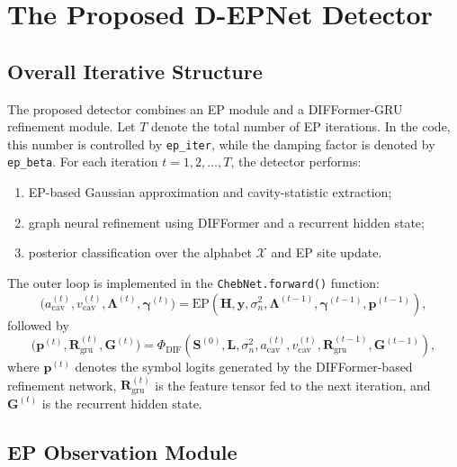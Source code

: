 \documentclass[conference]{IEEEtran}
\begin{document}
\section{The Proposed D-EPNet Detector}

\subsection{Overall Iterative Structure}

The proposed detector combines an EP module and a DIFFormer-GRU refinement module. Let $T$ denote the total number of EP iterations. In the code, this number is controlled by \texttt{ep\_iter}, while the damping factor is denoted by \texttt{ep\_beta}. For each iteration $t=1,2,\ldots,T$, the detector performs:
\begin{enumerate}
\item EP-based Gaussian approximation and cavity-statistic extraction;
\item graph neural refinement using DIFFormer and a recurrent hidden state;
\item posterior classification over the alphabet $\mathcal{X}$ and EP site update.
\end{enumerate}

The outer loop is implemented in the \texttt{ChebNet.forward()} function:
\begin{equation}
\big(a_{\mathrm{cav}}^{(t)}, v_{\mathrm{cav}}^{(t)}, \bm{\Lambda}^{(t)}, \bm{\gamma}^{(t)}\big)
=
\mathrm{EP}\!\left(
\mathbf{H}, \mathbf{y}, \sigma_n^2,
\bm{\Lambda}^{(t-1)}, \bm{\gamma}^{(t-1)},
\mathbf{p}^{(t-1)}
\right),
\end{equation}
followed by
\begin{equation}
\big(\mathbf{p}^{(t)}, \mathbf{R}_{\mathrm{gru}}^{(t)}, \mathbf{G}^{(t)}\big)
=
\Phi_{\mathrm{DIF}}\!\left(
\mathbf{S}^{(0)}, \mathbf{L}, \sigma_n^2,
a_{\mathrm{cav}}^{(t)}, v_{\mathrm{cav}}^{(t)},
\mathbf{R}_{\mathrm{gru}}^{(t-1)}, \mathbf{G}^{(t-1)}
\right),
\label{eq:overall_phi}
\end{equation}
where $\mathbf{p}^{(t)}$ denotes the symbol logits generated by the DIFFormer-based refinement network, $\mathbf{R}_{\mathrm{gru}}^{(t)}$ is the feature tensor fed to the next iteration, and $\mathbf{G}^{(t)}$ is the recurrent hidden state.

\subsection{EP Observation Module}
\end{document}
